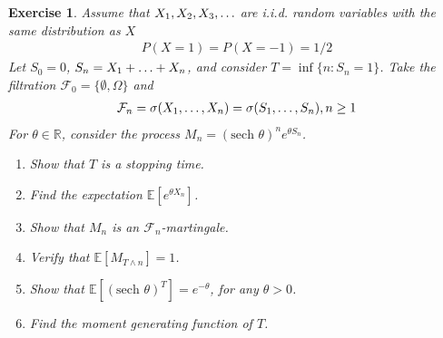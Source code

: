 \documentclass[12pt]{article}
\theoremstyle{colon}
\newtheorem{exercise}{Exercise}
\begin{document}
\clearpage

\begin{exercise}
  Assume that $X_1, X_2, X_3, \mathellipsis$ are i.i.d. random variables with the same distribution as $X$
  \begin{gather*}
    P(X = 1) = P(X = -1) = 1/2
  \end{gather*}
  Let $S_0 = 0$, $S_n = X_1 + \mathellipsis + X_n$, and consider $T = \inf \{ n : S_n = 1 \}$. Take the filtration $\mathcal{F}_0 = \{ \emptyset, \Omega \}$ and
  \begin{gather*}
    \mathcal{F}_n = \sigma(X_1, \mathellipsis, X_n) = \sigma(S_1, \mathellipsis, S_n), n \geq 1
  \end{gather*}
  For $\theta \in \mathbb{R}$, consider the process $M_n = (\text{sech } \theta)^n e^{\theta S_n}$.
  \begin{enumerate}[label=\alph*)]
    \item Show that $T$ is a stopping time.
    \item Find the expectation $\mathbb{E}[e^{\theta X_n}]$.
    \item Show that $M_n$ is an $\mathcal{F}_n$-martingale.
    \item Verify that $\mathbb{E}[M_{T \land n}] = 1$.
    \item Show that $\mathbb{E}[(\text{sech } \theta)^T] = e^{-\theta}$, for any $\theta > 0$.
    \item Find the moment generating function of $T$.
  \end{enumerate}
\end{exercise}
\end{document}

